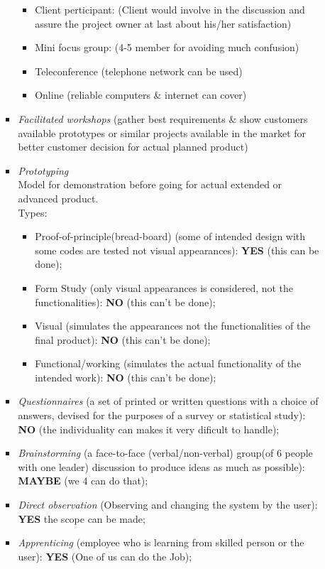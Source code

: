 \documentclass{article}
\begin{document}
\begin{enumerate}
\begin{itemize}
\begin{itemize}
\begin{itemize}
						\item Client perticipant: (Client would involve in the discussion and assure the project owner at last about his/her satisfaction)
						\item Mini focus group: (4-5 member for avoiding much confusion)
						\item Teleconference (telephone network can be used)
						\item Online (reliable computers \& internet can cover)
					\end{itemize}
					\item \emph{Facilitated workshops} (gather best requirements \& show customers available prototypes or similar projects available in the market for better customer decision for actual planned product)
					\item \emph{Prototyping}
					\\Model for demonstration before going for actual extended or advanced product. \\Types:
					\begin{itemize}
						\item Proof-of-principle(bread-board) (some of intended design with some codes are tested not visual appearances): \textbf{YES} (this can be done);
						\item Form Study (only visual appearances is considered, not the functionalities): \textbf{NO} (this can't be done);
						\item Visual (simulates the appearances not the functionalities of the final product): \textbf{NO} (this can't be done);
						\item Functional/working (simulates the actual functionality of the intended work): \textbf{NO} (this can't be done);
					\end{itemize}
					\item \emph{Questionnaires} (a set of printed or written questions with a choice of answers, devised for the purposes of a survey or statistical study): \textbf{NO} (the individuality can makes it very dificult to handle);
					\item \emph{Brainstorming} (a face-to-face (verbal/non-verbal) group(of 6 people with one leader) discussion to produce ideas as much as possible): \textbf{MAYBE} (we 4 can do that);
					\item \emph{Direct observation} (Observing and changing the system by the user): \textbf{YES} the scope can be made;
					\item \emph{Apprenticing} (employee who is learning from skilled person or the user): \textbf{YES} (One of us can do the Job);

\end{itemize}
\end{itemize}
\end{enumerate}
\end{document}
